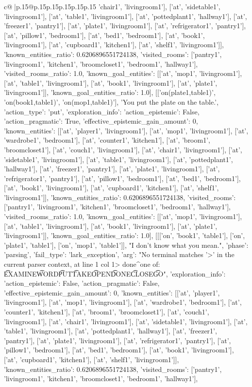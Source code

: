 \documentclass{article}
\begin{document}
{\begin{supertabular}{c@{$\;$}|p{.15\linewidth}@{}p{.15\linewidth}p{.15\linewidth}p{.15\linewidth}p{.15\linewidth}p{.15\linewidth}}
{{{'chair1', 'livingroom1'], ['at', 'sidetable1', 'livingroom1'], ['at', 'table1', 'livingroom1'], ['at', 'pottedplant1', 'hallway1'], ['at', 'freezer1', 'pantry1'], ['at', 'plate1', 'livingroom1'], ['at', 'refrigerator1', 'pantry1'], ['at', 'pillow1', 'bedroom1'], ['at', 'bed1', 'bedroom1'], ['at', 'book1', 'livingroom1'], ['at', 'cupboard1', 'kitchen1'], ['at', 'shelf1', 'livingroom1']], 'known_entities_ratio': 0.6206896551724138, 'visited_rooms': ['pantry1', 'livingroom1', 'kitchen1', 'broomcloset1', 'bedroom1', 'hallway1'], 'visited_rooms_ratio': 1.0, 'known_goal_entities': [['at', 'mop1', 'livingroom1'], ['at', 'table1', 'livingroom1'], ['at', 'book1', 'livingroom1'], ['at', 'plate1', 'livingroom1']], 'known_goal_entities_ratio': 1.0}}], [['on(plate1,table1)', 'on(book1,table1)', 'on(mop1,table1)'], 'You put the plate on the table.', {'action_type': 'put', 'exploration_info': {'action_epistemic': False, 'action_pragmatic': True, 'effective_epistemic_gain_amount': 0, 'known_entities': [['at', 'player1', 'livingroom1'], ['at', 'mop1', 'livingroom1'], ['at', 'wardrobe1', 'bedroom1'], ['at', 'counter1', 'kitchen1'], ['at', 'broom1', 'broomcloset1'], ['at', 'couch1', 'livingroom1'], ['at', 'chair1', 'livingroom1'], ['at', 'sidetable1', 'livingroom1'], ['at', 'table1', 'livingroom1'], ['at', 'pottedplant1', 'hallway1'], ['at', 'freezer1', 'pantry1'], ['at', 'plate1', 'livingroom1'], ['at', 'refrigerator1', 'pantry1'], ['at', 'pillow1', 'bedroom1'], ['at', 'bed1', 'bedroom1'], ['at', 'book1', 'livingroom1'], ['at', 'cupboard1', 'kitchen1'], ['at', 'shelf1', 'livingroom1']], 'known_entities_ratio': 0.6206896551724138, 'visited_rooms': ['pantry1', 'livingroom1', 'kitchen1', 'broomcloset1', 'bedroom1', 'hallway1'], 'visited_rooms_ratio': 1.0, 'known_goal_entities': [['at', 'mop1', 'livingroom1'], ['at', 'table1', 'livingroom1'], ['at', 'book1', 'livingroom1'], ['at', 'plate1', 'livingroom1']], 'known_goal_entities_ratio': 1.0}}], [[['on', 'book1', 'table1'], ['on', 'plate1', 'table1'], ['on', 'mop1', 'table1']], "I don't know what you mean.", {'phase': 'parsing', 'fail_type': 'lark_exception', 'arg': "No terminal matches '>' in the current parser context, at line 1 col 1\n\n> done\n^\nExpected one of: \n\t* EXAMINE\n\t* WORD\n\t* PUT\n\t* TAKE\n\t* OPEN\n\t* DONE\n\t* CLOSE\n\t* GO\n", 'exploration_info': {'action_epistemic': False, 'action_pragmatic': False, 'effective_epistemic_gain_amount': 0, 'known_entities': [['at', 'player1', 'livingroom1'], ['at', 'mop1', 'livingroom1'], ['at', 'wardrobe1', 'bedroom1'], ['at', 'counter1', 'kitchen1'], ['at', 'broom1', 'broomcloset1'], ['at', 'couch1', 'livingroom1'], ['at', 'chair1', 'livingroom1'], ['at', 'sidetable1', 'livingroom1'], ['at', 'table1', 'livingroom1'], ['at', 'pottedplant1', 'hallway1'], ['at', 'freezer1', 'pantry1'], ['at', 'plate1', 'livingroom1'], ['at', 'refrigerator1', 'pantry1'], ['at', 'pillow1', 'bedroom1'], ['at', 'bed1', 'bedroom1'], ['at', 'book1', 'livingroom1'], ['at', 'cupboard1', 'kitchen1'], ['at', 'shelf1', 'livingroom1']], 'known_entities_ratio': 0.6206896551724138, 'visited_rooms': ['pantry1', 'livingroom1', 'kitchen1', 'broomcloset1', 'bedroom1', 'hallway1'], }}}
\end{supertabular}}
\end{document}
